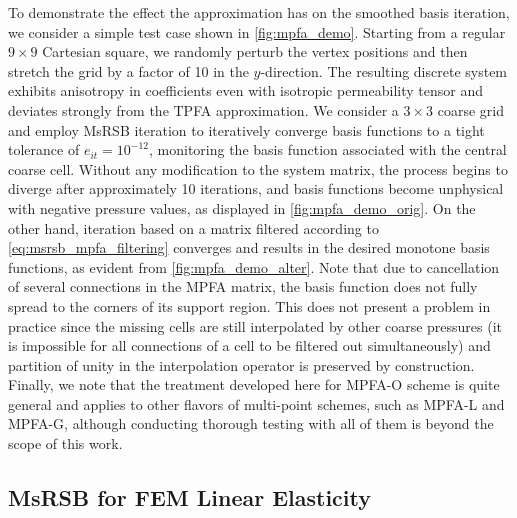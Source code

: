To demonstrate the effect the approximation has on the smoothed basis iteration, we consider a simple test case shown in \autoref{fig:mpfa_demo}.   Starting from a regular $9 \times 9$ Cartesian square, we randomly perturb the vertex positions and then stretch the grid by a factor of 10 in the $y$-direction.   The resulting discrete system exhibits anisotropy in coefficients even with isotropic permeability tensor and deviates strongly from the TPFA approximation.   We consider a $3 \times 3$ coarse grid and employ MsRSB iteration to iteratively converge basis functions to a tight tolerance of $e_{it} = 10^{-12}$, monitoring the basis function associated with the central coarse cell.   Without any modification to the system matrix, the process begins to diverge after approximately 10 iterations, and basis functions become unphysical with negative pressure values, as displayed in \autoref{fig:mpfa_demo_orig}.   On the other hand, iteration based on a matrix filtered according to \eqref{eq:msrsb_mpfa_filtering} converges and results in the desired monotone basis functions, as evident from \autoref{fig:mpfa_demo_alter}.   Note that due to cancellation of several connections in the MPFA matrix, the basis function does not fully spread to the corners of its support region.   This does not present a problem in practice since the missing cells are still interpolated by other coarse pressures (it is impossible for all connections of a cell to be filtered out simultaneously) and partition of unity in the interpolation operator is preserved by construction.   Finally, we note that the treatment developed here for MPFA-O scheme is quite general and applies to other flavors of multi-point schemes, such as MPFA-L and MPFA-G, although conducting thorough testing with all of them is beyond the scope of this work.

\subsection{MsRSB for FEM Linear Elasticity}
\label{subsec:enhanced_msrsb_mech}

